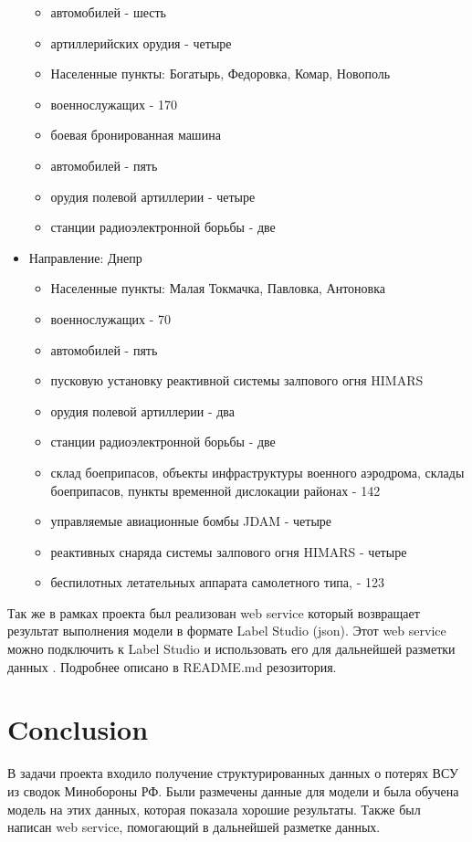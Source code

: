 \documentclass{article}
\begin{document}
\begin{itemize}
\begin{itemize}
        \item автомобилей - шесть
        \item артиллерийских орудия - четыре
   \end{itemize}
  \begin{itemize}
        \item Населенные пункты: Богатырь, Федоровка, Комар, Новополь
        \item военнослужащих - 170
        \item боевая бронированная машина
        \item автомобилей - пять
        \item орудия полевой артиллерии - четыре
        \item станции радиоэлектронной борьбы - две
   \end{itemize}
\item Направление:  Днепр
   \begin{itemize}
      \item Населенные пункты: Малая Токмачка, Павловка, Антоновка
      \item военнослужащих - 70
      \item автомобилей  - пять  
      \item пусковую установку реактивной системы залпового огня HIMARS
      \item орудия полевой артиллерии - два
      \item станции радиоэлектронной борьбы - две
      \item склад боеприпасов,   объекты инфраструктуры военного аэродрома,   склады боеприпасов,   пункты временной дислокации
      районах - 142
      \item управляемые авиационные бомбы JDAM - четыре
      \item реактивных снаряда системы залпового огня HIMARS - четыре
      \item беспилотных летательных аппарата самолетного типа,  - 123
  \end{itemize}
\end{itemize}

Так же в рамках проекта был реализован web service который возвращает результат выполнения модели в формате Label Studio (json). Этот web service можно подключить к Label Studio и использовать его для дальнейшей разметки данных \cite{LSMLB}. Подробнее описано в README.md резозитория.

\section{Conclusion}
В задачи проекта входило получение структурированных данных о потерях ВСУ из сводок Минобороны РФ. Были размечены данные для модели и была обучена модель на этих данных, которая показала хорошие результаты. Также был написан web service, помогающий в дальнейшей разметке данных.



\end{document}
